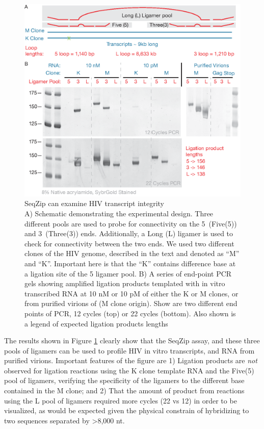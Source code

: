 	  \begin{figure} %
  	  \centering 
	    \includegraphics{Figures/SeqZipMethod/HIVviaSeqZip.eps}
    	\caption[SeqZip can examine HIV transcript integrity]
    	{
	      SeqZip can examine HIV transcript integrity\\[0.25cm]
      	A) Schematic demonstrating the experimental design. Three different pools are used to probe for connectivity on the 5\textprime~(Five(5)) and 3\textprime~(Three(3)) ends. Additionally, a Long (L) ligamer is used to check for connectivity between the two ends. We used two different clones of the HIV genome, described in the text and denoted as ``M'' and ``K''. Important here is that the ``K'' contains difference base at a ligation site of the 5 ligamer pool.
        B) A series of end-point PCR gels showing amplified ligation products templated with in vitro transcribed RNA at 10 nM or 10 pM of either the K or M clones, or from purified virions of (M clone origin). Show are two different end points of PCR, 12 cycles (top) or 22 cycles (bottom). Also shown is a legend of expected ligation products lengths
    		}
    	\label{SeqZipMethod:fig:Hiv tx via SeqZip}
  		\end{figure}

    The results shown in Figure \ref{SeqZipMethod:fig:Hiv tx via SeqZip} clearly show that the SeqZip assay, and these three pools of ligamers can be used to profile HIV in vitro transcripts, and RNA from purified virions. Important features of the figure are 1) Ligation products are \textit{not} observed for ligation reactions using the K clone template RNA and the Five(5) pool of ligamers, verifying the specificity of the ligamers to the different base contained in the M clone; and 2) That the amount of product from reactions using the L pool of ligamers required more cycles (22 vs 12) in order to be visualized, as would be expected given the physical constrain of hybridizing to two sequences separated by >8,000 nt. 

